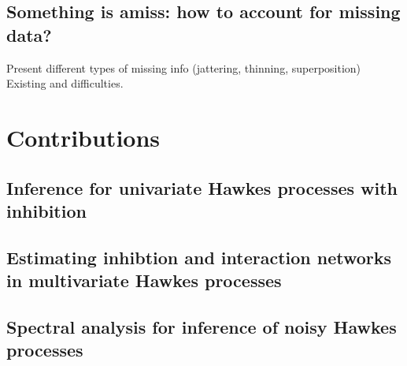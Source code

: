     \subsection{Something is amiss: how to account for missing data?}
        Present different types of missing info (jattering, thinning, superposition)
        Existing and difficulties.


\section{Contributions}
    \subsection{Inference for univariate Hawkes processes with inhibition}
    \subsection{Estimating inhibtion and interaction networks in multivariate Hawkes processes}
    \subsection{Spectral analysis for inference of noisy Hawkes processes}

